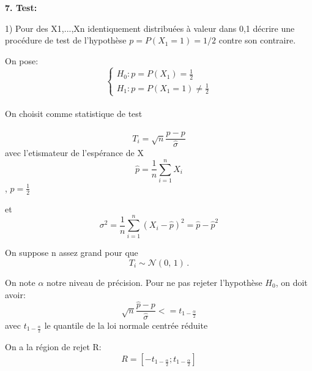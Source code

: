 \vspace{5mm}

{\fontsize{12pt}{22pt} \textbf{7. Test:}\par}

\vspace{5mm}

1) Pour des X1,...,Xn identiquement distribuées à valeur dans {0,1} décrire une procédure de test de l’hypothèse $p = P(X_1=1)=1/2$ contre son contraire.

On pose:
$$\begin{cases}
    H_0: p =P(X_1) = \frac{1}{2}  \\
    H_1: p = P(X_1=1) \neq \frac{1}{2}
\end{cases} $$
\\

\noindent
On choisit comme statistique de test

$$ T_i = \sqrt{n}\frac{\hat{p}- p}{\hat{\sigma}} $$
avec l'etismateur de l'espérance de X $$\hat{p} = \frac{1}{n}\sum^n_{i=1} X_i $$ , $p = \frac{1}{2}$

et $$\sigma^2 = \frac{1}{n}\sum^n_{i=1}{(X_i- \hat{p})^2} = \hat{p} - \hat{p}^2$$ 

\noindent
On suppose n assez grand pour que $$T_i \sim \mathcal{N}(0,\,1)\,.$$

\noindent
On note $\alpha$ notre niveau de précision. Pour ne pas rejeter l'hypothèse $H_0$, on doit avoir:
$$ \sqrt{n}\frac{\hat{p}-p}{\hat{\sigma}} <= t_{1-\frac{\alpha}{2}}$$ avec $t_{1-\frac{\alpha}{2}}$ le quantile de la loi normale centrée réduite

\noindent
On a la région de rejet R:
$$ R=[-t_{1-\frac{\alpha}{2}}; t_{1-\frac{\alpha}{2}}]$$
